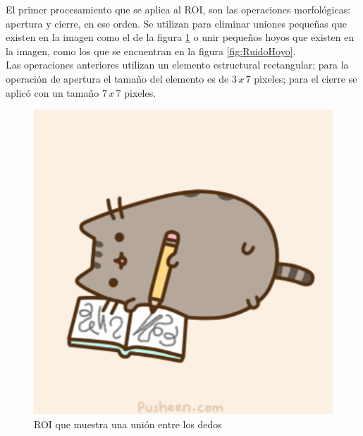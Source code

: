 El primer procesamiento que se aplica al ROI, son las operaciones morfológicas: apertura y cierre, en ese orden. Se utilizan para eliminar uniones pequeñas que existen en la imagen como el de la figura \ref{fig:RuidoUnion} o unir pequeños hoyos que existen en la imagen, como los que se encuentran en la figura \ref{fig:RuidoHoyo}.\\
Las operaciones anteriores utilizan un elemento estructural rectangular; para la operación de apertura el tamaño del elemento es de $3 \, x \, 7$ pixeles; para el cierre se aplic\'o con un tamaño  $7 \, x \, 7$ pixeles.\\
\begin{figure}[h!]
\begin{center}
\includegraphics[scale=.5]{./Figures/pusheen.png}
\end{center}
\caption{ROI que muestra una unión entre los dedos}
\label{fig:RuidoUnion}
\end{figure}   
